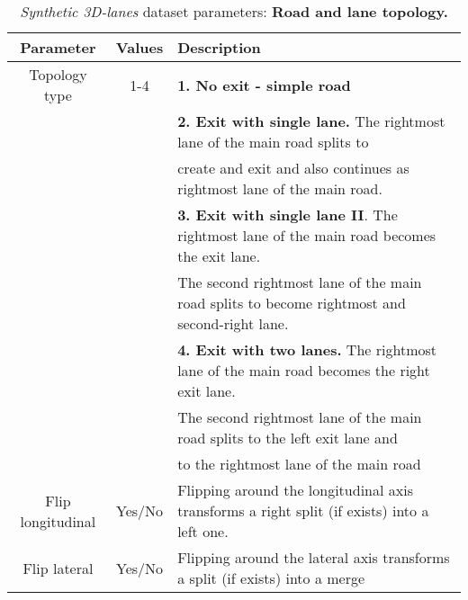 \documentclass[10pt,twocolumn,letterpaper]{article}
\begin{document}
\begin{table*}[h]
	\centering
	\caption{\emph{Synthetic 3D-lanes} dataset parameters: \textbf{Road and lane topology.}}
	\begin{tabular} {ccl}
		\toprule
		\textbf{Parameter} &  \textbf{Values} &  \textbf{Description}  \\
		\toprule
		Topology type & 1-4 & 
		\textbf{1. No exit - simple road}\\
		& & \textbf{2. Exit with single lane.} The rightmost lane of the main road splits to \\ 
		& & create and exit and also continues as rightmost lane of the main road. \\
		& & \textbf{3. Exit with single lane II}. The rightmost lane of the main road becomes the exit lane. \\ 
		& & The second rightmost lane of the main road splits to become rightmost and second-right lane.\\
		& & \textbf{4. Exit with two lanes.} The rightmost lane of the main road becomes the right exit lane.\\ 
		& & The second rightmost lane of the main road splits to the left exit lane and \\ 
		& & to the rightmost lane of the main road\\
		\midrule
		Flip longitudinal & Yes/No & Flipping around the longitudinal axis transforms a right split (if exists) into a left one. \\
		
		\midrule
		Flip lateral & Yes/No & Flipping around the lateral axis transforms a split (if exists) into a merge\\
		
		\bottomrule
		
	\end{tabular} 
	\label{tab:real}
\end{table*}
\end{document}
